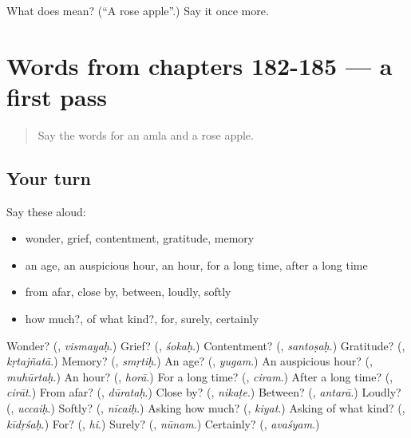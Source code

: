 \begin{tcolorbox}[breakable,colback=teal!4,colframe=teal!35!black,title={Before you move on}]
What does  mean? (\textquotedblleft{}A rose apple\textquotedblright{}.) Say it once more.
\end{tcolorbox}
\section[(dialogue)]{Words from chapters 182-185 — a first pass}

\label{lesson:SA-R190-first-pass-words-from-chapters-182-185}



\begin{quote}
Say the words for an amla and a rose apple.
\end{quote}

\subsection*{Your turn}
Say these aloud:

\begin{itemize}
\raggedright
  \item wonder, grief, contentment, gratitude, memory
  \item an age, an auspicious hour, an hour, for a long time, after a long time
  \item from afar, close by, between, loudly, softly
  \item how much?, of what kind?, for, surely, certainly
\end{itemize}

\begin{tcolorbox}[breakable,colback=teal!4,colframe=teal!35!black,title={Before you move on}]
Wonder? (\textbf{}, \emph{vismayaḥ}.) Grief? (\textbf{}, \emph{śokaḥ}.) Contentment? (\textbf{}, \emph{santoṣaḥ}.) Gratitude? (\textbf{}, \emph{kṛtajñatā}.) Memory? (\textbf{}, \emph{smṛtiḥ}.) An age? (\textbf{}, \emph{yugam}.) An auspicious hour? (\textbf{}, \emph{muhūrtaḥ}.) An hour? (\textbf{}, \emph{horā}.) For a long time? (\textbf{}, \emph{ciram}.) After a long time? (\textbf{}, \emph{cirāt}.) From afar? (\textbf{}, \emph{dūrataḥ}.) Close by? (\textbf{}, \emph{nikaṭe}.) Between? (\textbf{}, \emph{antarā}.) Loudly? (\textbf{}, \emph{uccaiḥ}.) Softly? (\textbf{}, \emph{nīcaiḥ}.) Asking how much? (\textbf{}, \emph{kiyat}.) Asking of what kind? (\textbf{}, \emph{kīdṛśaḥ}.) For? (\textbf{}, \emph{hi}.) Surely? (\textbf{}, \emph{nūnam}.) Certainly? (\textbf{}, \emph{avaśyam}.)
\end{tcolorbox}
